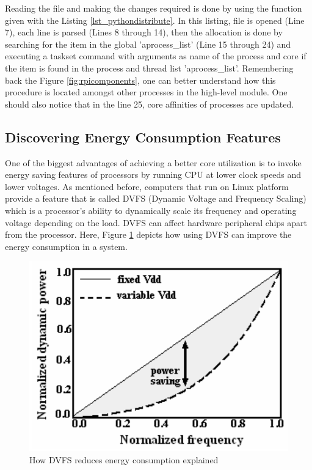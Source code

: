 Reading the file and making the changes required is done by using the function given with the Listing \ref{lst_pythondistribute}. In this listing, file is opened (Line 7), each line is parsed (Lines 8 through 14), then the allocation is done by searching for the item in the global 'aprocess{\_}list' (Line 15 through 24) and executing a taskset command with arguments as name of the process and core if the item is found in the process and thread list 'aprocess{\_}list'. Remembering back the Figure \ref{fig:rpicomponents}, one can better understand how this procedure is located amongst other processes in the high-level module. One should also notice that in the line 25, core affinities of processes are updated.


\subsection{Discovering Energy Consumption Features}
One of the biggest advantages of achieving a better core utilization is to invoke energy saving features of processors by running CPU at lower clock speeds and lower voltages. As mentioned before, computers that run on Linux platform provide a feature that is called DVFS (Dynamic Voltage and Frequency Scaling) \cite{dvfsieee} which is a processor's ability to dynamically scale its frequency and operating voltage depending on the load. DVFS can affect hardware peripheral chips apart from the processor. Here, Figure \ref{fig:dvfsexplanation} \cite{dvfspaper} depicts how using DVFS can improve the energy consumption in a system.

\begin{figure}[!ht]
	\centering
	\captionsetup{justification=centering}
	\includegraphics[scale=0.40]{content/images/dvfsexplanation.png}
	\caption{How DVFS reduces energy consumption explained \cite{dvfspaper}}
	\label{fig:dvfsexplanation}
\end{figure}

